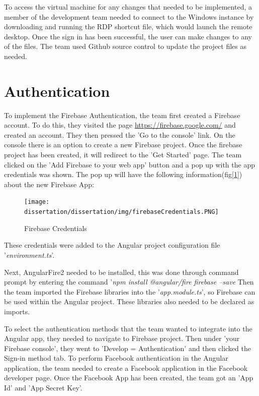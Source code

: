 \bigskip

To access the virtual machine for any changes that needed to be implemented, a member of the development team needed to connect to the Windows instance by downloading and running the RDP shortcut file, which would launch the remote desktop. Once the sign in has been successful, the user can make changes to any of the files. The team used Github source control to update the project files as needed.

\section{Authentication}
\label{sec:SystemDesignAuthentication}
To implement the Firebase Authentication, the team first created a Firebase account. To do this, they visited the page \href{https://firebase.google.com/}{https://firebase.google.com/} and created an account. They then pressed the 'Go to the console' link. On the console there is an option to create a new Firebase project. Once the firebase project has been created, it will redirect to the 'Get Started' page. The team clicked on the 'Add Firebase to your web app' button and a pop up with the app credentials was shown. The pop up will have the following information(fig[\ref{fig:credentials}]) about the new Firebase App:

\begin{figure}[H]
    \centering
    \texttt{[image: dissertation/dissertation/img/firebaseCredentials.PNG]}
    \caption{Firebase Credentials}
    \label{fig:credentials}
\end{figure}
These credentials were added to the Angular project configuration file '\textit{environment.ts}'.

Next, AngularFire2 needed to be installed, this was done through command prompt by entering the command '\textit{npm install @angular/fire firebase --save} Then the team imported the Firebase libraries into the '\textit{app.module.ts}', so Firebase can be used within the Angular project. These libraries also needed to be declared as imports.

\bigskip

To select the authentication methods that the team wanted to integrate into the Angular app, they needed to navigate to Firebase project. Then under 'your Firebase console', they went to 'Develop = Authentication' and then clicked the Sign-in method tab. To perform Facebook authentication in the Angular application, the team needed to create a Facebook application in the Facebook developer page. Once the Facebook App has been created, the team got an 'App Id' and 'App Secret Key'.

